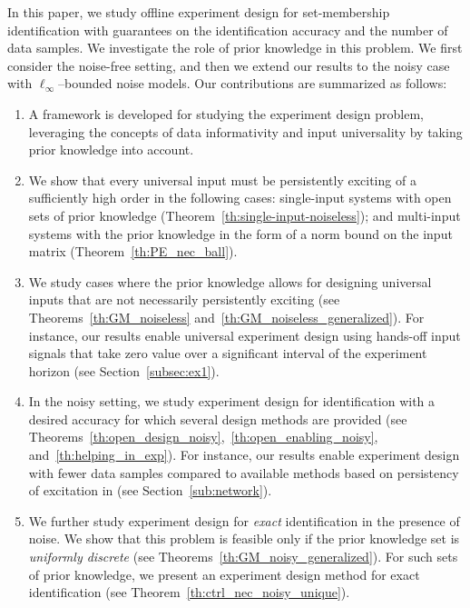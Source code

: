 \documentclass[journal,twoside,web]{ieeecolor}
\begin{document}
In this paper, we study offline experiment design for set-membership identification with guarantees on the identification accuracy and the number of data samples. We investigate the role of prior knowledge in this problem. We first consider the noise-free setting, and then we extend our results to the noisy case with $\ell_\infty$--bounded noise models. Our contributions are summarized as follows:
\begin{enumerate}[wide]
    \item A framework is developed for studying the experiment design problem, leveraging the concepts of data informativity and input universality by taking prior knowledge into account.
    \item We show that every universal input must be persistently exciting of a sufficiently high order in the following cases: single-input systems with open sets of prior knowledge (Theorem~\ref{th:single-input-noiseless}); and multi-input systems with the prior knowledge in the form of a norm bound on the input matrix (Theorem~\ref{th:PE_nec_ball}). %
    \item We study cases where the prior knowledge allows for designing universal inputs that are not necessarily persistently exciting (see Theorems~\ref{th:GM_noiseless} and~\ref{th:GM_noiseless_generalized}). For instance, our results enable universal experiment design using hands-off input signals that take zero value over a significant interval of the experiment horizon (see Section~\ref{subsec:ex1}). %
    \item In the noisy setting, we study experiment design for identification with a desired accuracy for which several design methods are provided (see Theorems~\ref{th:open_design_noisy},~\ref{th:open_enabling_noisy}, and~\ref{th:helping_in_exp}). For instance, our results enable experiment design with fewer data samples compared to available methods based on persistency of excitation in \cite{willems2005note,coulson2022quantitative} (see Section~\ref{sub:network}).
    \item We further study experiment design for \emph{exact} identification in the presence of noise. We show that this problem is feasible only if the prior knowledge set is \emph{uniformly discrete} (see Theorems~\ref{th:GM_noisy_generalized}). For such sets of prior knowledge, we present an experiment design method for exact identification (see Theorem~\ref{th:ctrl_nec_noisy_unique}). %
\end{enumerate}
\end{document}
